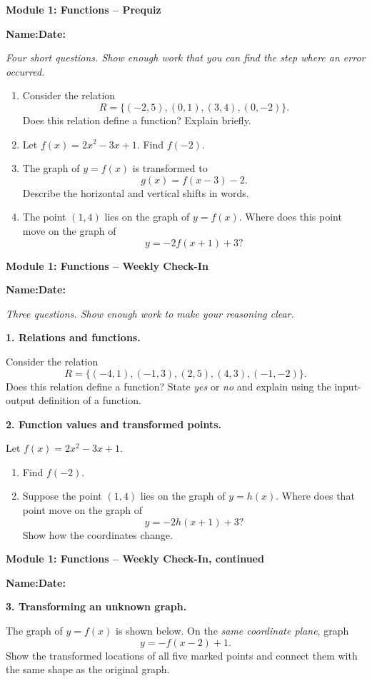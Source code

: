 \documentclass[11pt]{article}
\newcommand{\assessmenttitle}[2]{%
  {\Large\bfseries Module #1: #2}\par\vspace{3pt}
}
\newcommand{\studentline}{%
\noindent\textbf{Name:}\hspace{2.6in}\textbf{Date:}\hspace{1.15in}\par\vspace{7pt}}
\newcommand{\directions}[1]{\textit{#1}\par\vspace{4pt}}
\newcommand{\answerblank}[1]{\vspace{#1}}
\begin{document}
\assessmenttitle{1}{Functions -- Prequiz}
\studentline
\directions{Four short questions. Show enough work that you can find the step where an error occurred.}
\begin{enumerate}
\item Consider the relation
\[
R=\{(-2,5),(0,1),(3,4),(0,-2)\}.
\]
Does this relation define a function? Explain briefly.
\answerblank{0.48in}

\item Let $f(x)=2x^2-3x+1$. Find $f(-2)$.
\answerblank{0.55in}

\item The graph of $y=f(x)$ is transformed to
\[
g(x)=f(x-3)-2.
\]
Describe the horizontal and vertical shifts in words.
\answerblank{0.52in}

\item The point $(1,4)$ lies on the graph of $y=f(x)$. Where does this point move on the graph of
\[
y=-2f(x+1)+3?
\]
\answerblank{0.62in}
\end{enumerate}
\newpage

\assessmenttitle{1}{Functions -- Weekly Check-In}
\studentline
\directions{Three questions. Show enough work to make your reasoning clear.}
\textbf{1. Relations and functions.}

Consider the relation
\[
R=\{(-4,1),(-1,3),(2,5),(4,3),(-1,-2)\}.
\]
Does this relation define a function? State \emph{yes} or \emph{no} and explain using the input-output definition of a function.
\answerblank{1.10in}

\textbf{2. Function values and transformed points.}

Let $f(x)=2x^2-3x+1$.
\begin{enumerate}[label=(\alph*),leftmargin=0.35in]
\item Find $f(-2)$.
\answerblank{0.42in}
\item Suppose the point $(1,4)$ lies on the graph of $y=h(x)$. Where does that point move on the graph of
\[
y=-2h(x+1)+3?
\]
Show how the coordinates change.
\answerblank{0.58in}
\end{enumerate}
\newpage

\assessmenttitle{1}{Functions -- Weekly Check-In, continued}
\studentline
\textbf{3. Transforming an unknown graph.}

The graph of $y=f(x)$ is shown below. On the \emph{same coordinate plane}, graph
\[
y=-f(x-2)+1.
\]
Show the transformed locations of all five marked points and connect them with the same shape as the original graph.
\end{document}
